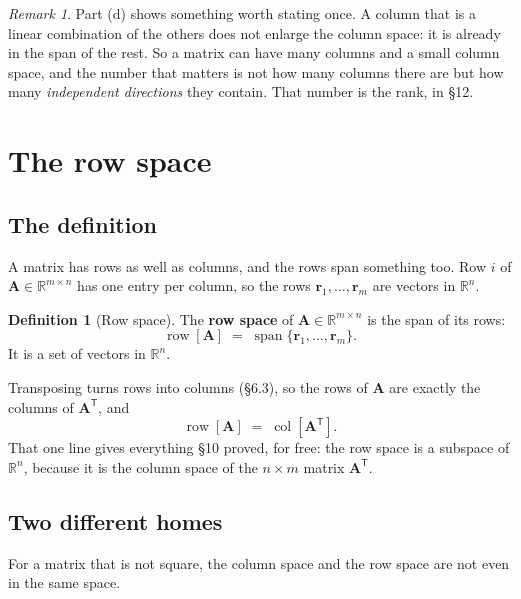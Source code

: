 \documentclass[11pt]{article}
\theoremstyle{plain}
\theoremstyle{definition}
\newtheorem{defn}{Definition}[section]
\theoremstyle{remark}
\newtheorem*{rmk}{Remark}
\newcommand{\R}{\mathbb{R}}
\newcommand{\vc}[1]{\mathbf{#1}}        %
\newcommand{\mt}[1]{\mathbf{#1}}        %
\newcommand{\T}{^{\mathsf{T}}}          %
\newcommand{\colsp}[1]{\operatorname{col}[#1]}
\newcommand{\rowsp}[1]{\operatorname{row}[#1]}
\DeclareMathOperator{\spanop}{span}
\begin{document}
\begin{rmk}
Part (d) shows something worth stating once. A column that is a linear
combination of the others does not enlarge the column space: it is already in
the span of the rest. So a matrix can have many columns and a small column
space, and the number that matters is not how many columns there are but how
many \emph{independent directions} they contain. That number is the rank, in
\S12.
\end{rmk}

\section{The row space}

\subsection{The definition}
A matrix has rows as well as columns, and the rows span something too. Row $i$
of $\mt{A}\in\R^{m\times n}$ has one entry per column, so the rows
$\vc{r}_1,\dots,\vc{r}_m$ are vectors in $\R^{n}$.

\begin{defn}[Row space]
The \textbf{row space} of $\mt{A}\in\R^{m\times n}$ is the span of its rows:
\[
  \rowsp{\mt{A}} \;=\; \spanop\{\vc{r}_1,\dots,\vc{r}_m\} .
\]
It is a set of vectors in $\R^{n}$.
\end{defn}

\noindent Transposing turns rows into columns (\S6.3), so the rows of
$\mt{A}$ are exactly the columns of $\mt{A}\T$, and
\[
  \rowsp{\mt{A}} \;=\; \colsp{\mt{A}\T} .
\]
That one line gives everything \S10 proved, for free: the row space is a
subspace of $\R^{n}$, because it is the column space of the $n\times m$ matrix
$\mt{A}\T$.

\subsection{Two different homes}
For a matrix that is not square, the column space and the row space are not
even in the same space.
\end{document}
